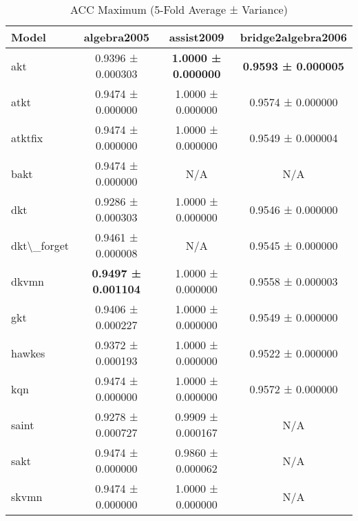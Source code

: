 \begin{table}[H]
\centering
\caption{ACC Maximum (5-Fold Average ± Variance)}
\label{tab:acc_max}
\begin{tabular}{lccc}
\toprule
Model & algebra2005 & assist2009 & bridge2algebra2006 \\
\midrule
akt & 0.9396 ± 0.000303 & \textbf{1.0000 ± 0.000000} & \textbf{0.9593 ± 0.000005} \\
atkt & 0.9474 ± 0.000000 & 1.0000 ± 0.000000 & 0.9574 ± 0.000000 \\
atktfix & 0.9474 ± 0.000000 & 1.0000 ± 0.000000 & 0.9549 ± 0.000004 \\
bakt & 0.9474 ± 0.000000 & N/A & N/A \\
dkt & 0.9286 ± 0.000303 & 1.0000 ± 0.000000 & 0.9546 ± 0.000000 \\
dkt\textbackslash{}_forget & 0.9461 ± 0.000008 & N/A & 0.9545 ± 0.000000 \\
dkvmn & \textbf{0.9497 ± 0.001104} & 1.0000 ± 0.000000 & 0.9558 ± 0.000003 \\
gkt & 0.9406 ± 0.000227 & 1.0000 ± 0.000000 & 0.9549 ± 0.000000 \\
hawkes & 0.9372 ± 0.000193 & 1.0000 ± 0.000000 & 0.9522 ± 0.000000 \\
kqn & 0.9474 ± 0.000000 & 1.0000 ± 0.000000 & 0.9572 ± 0.000000 \\
saint & 0.9278 ± 0.000727 & 0.9909 ± 0.000167 & N/A \\
sakt & 0.9474 ± 0.000000 & 0.9860 ± 0.000062 & N/A \\
skvmn & 0.9474 ± 0.000000 & 1.0000 ± 0.000000 & N/A \\
\bottomrule
\end{tabular}
\end{table}